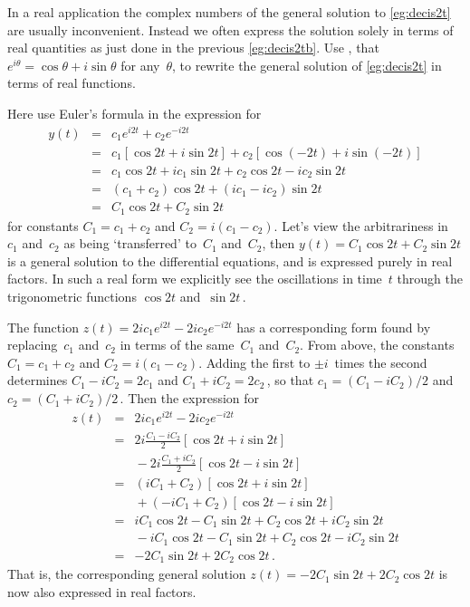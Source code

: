 \begin{example} \label{eg:realcis}
In a real application the complex numbers of the general solution to \autoref{eg:decis2t} are usually inconvenient.  
Instead we often express the solution solely in terms of real quantities as just done in the previous \autoref{eg:decis2tb}.
Use , that \(e^{i\theta}=\cos\theta+i\sin\theta\) for any~\(\theta\), to rewrite the general solution of \autoref{eg:decis2t} in terms of real functions.
\begin{solution}
Here use Euler's formula in the expression for
\begin{eqnarray*}
y(t)&=&c_1e^{i2t}+c_2e^{-i2t}
\\&=&c_1[\cos 2t+i\sin2t]+c_2[\cos(-2t)+i\sin(-2t)]
\\&=&c_1\cos2t+ic_1\sin2t +c_2\cos2t-ic_2\sin2t
\\&=&(c_1+c_2)\cos2t +(ic_1-ic_2)\sin2t
\\&=&C_1\cos2t+C_2\sin2t
\end{eqnarray*}
for constants \(C_1=c_1+c_2\) and \(C_2=i(c_1-c_2)\).
Let's view the arbitrariness in~\(c_1\) and~\(c_2\) as being `transferred' to~\(C_1\) and~\(C_2\), then \(y(t)=C_1\cos2t+C_2\sin2t\) is a general solution to the differential equations, and is expressed purely in real factors.
In such a real form we explicitly see the oscillations in time~\(t\) through the trigonometric functions \(\cos 2t\) and~\(\sin2t\)\,.

The function \(z(t)=2ic_1e^{i2t}-2ic_2e^{-i2t}\) has a corresponding form found by replacing~\(c_1\) and~\(c_2\) in terms of the same~\(C_1\) and~\(C_2\).
From above, the constants \(C_1=c_1+c_2\) and \(C_2=i(c_1-c_2)\).
Adding the first to \(\pm i\)~times the second determines \(C_1-iC_2=2c_1\) and \(C_1+iC_2=2c_2\)\,, so that \(c_1=(C_1-iC_2)/2\) and \(c_2=(C_1+iC_2)/2\)\,.  
Then the expression for
\begin{eqnarray*}
z(t)&=&2ic_1e^{i2t}-2ic_2e^{-i2t}
\\&=&2i\frac{C_1-iC_2}2[\cos2t+i\sin2t]
\\&&{}
-2i\frac{C_1+iC_2}2[\cos2t-i\sin2t]
\\&=&(iC_1+C_2)[\cos2t+i\sin2t]
\\&&{}
+(-iC_1+C_2)[\cos2t-i\sin2t]
\\&=&iC_1\cos2t-C_1\sin2t+C_2\cos2t+iC_2\sin2t
\\&&{}
-iC_1\cos2t-C_1\sin2t+C_2\cos2t-iC_2\sin2t
\\&=&-2C_1\sin2t+2C_2\cos2t\,.
\end{eqnarray*}
That is, the corresponding general solution \(z(t)=-2C_1\sin2t+2C_2\cos2t\) is now also expressed in real factors.
\end{solution}
\end{example}




